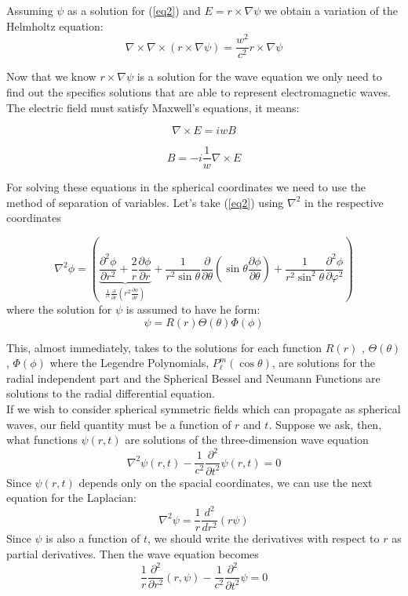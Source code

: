 \documentclass[paper=a4, fontsize=11pt]{scrartcl} %
\numberwithin{equation}{section} %
\numberwithin{figure}{section} %
\numberwithin{table}{section} %
\begin{document}
Assuming $\psi$ as a solution for (\ref{eq2}) and $E=r\times \nabla \psi$ we obtain a variation of the Helmholtz equation:
\begin{equation}
\nabla \times \nabla \times (r\times \nabla \psi)= \frac{w^2}{c^2} r\times \nabla \psi
\end{equation}

Now that we know $r\times \nabla \psi$ is a solution for the wave equation we only need to find out the specifics solutions that are able to represent electromagnetic waves. The electric field must satisfy Maxwell's equations, it means:

\begin{equation}
\nabla \times E=iwB
\end{equation}

\begin{equation}
B=-i\frac{1}{w} \nabla \times E
\end{equation}

For solving these equations in the spherical coordinates we need to use the method of separation of variables. Let's take (\ref{eq2}) using $\nabla^2$ in the respective coordinates


\begin{equation}
\nabla ^2\phi = \left( {\underbrace {\frac{\partial ^2\phi }{\partial r^2} +
\frac{2}{r}\frac{\partial \phi }{\partial
r}}_{\frac{1}{^{r^2}}\frac{\partial }{\partial r}\left( {r^2\frac{\partial
\phi }{\partial r}} \right)} + \frac{1}{r^2\sin \theta }\frac{\partial
}{\partial \theta }\left( {\sin \theta \frac{\partial \phi }{\partial \theta
}} \right) + \frac{1}{r^2\sin ^2\theta }\frac{\partial ^2\phi }{\partial
\varphi ^2}} \right)
\end{equation}
where the solution for $\psi$ is assumed to have he form:
\begin{equation}
\psi=R(r)\Theta(\theta) \Phi(\phi)
\end{equation}

This, almost immediately, takes to the solutions for each 
function $R(r)$ , $\Theta(\theta)$ , $\Phi(\phi)$ where the Legendre Polynomials, $P_{\ell}^{m}\left(\cos\theta\right)$, are solutions 
for the radial independent part and the Spherical Bessel and Neumann Functions are solutions to the radial differential equation.\\

If we wish to consider spherical symmetric fields which can propagate as spherical waves, our field quantity must be a function of $r$ and $t$.
Suppose we ask, then, what functions  $\psi (r,t)$ are solutions of the three-dimension wave equation 
\begin{equation}
 \nabla^2 \psi (r,t)-\frac{1}{c^2}\frac{\partial^2 }{\partial t^2}\psi (r,t) =0
\end{equation}
 Since $\psi (r,t)$ depends only on the spacial coordinates, we can use the next equation for the Laplacian:
 $$ \nabla^2 \psi= \frac{1}{r}\frac{d^2}{dr^2}(r\psi)$$
Since $\psi$ is also a function of $t$, we should write the derivatives with respect to $r$ as partial derivatives. Then the wave equation becomes
$$\frac{1}{r}\frac{\partial^2 }{\partial r^2}(r,\psi)-\frac{1}{c^2}\frac{\partial^2 }{\partial t^2}\psi=0 $$
\end{document}
